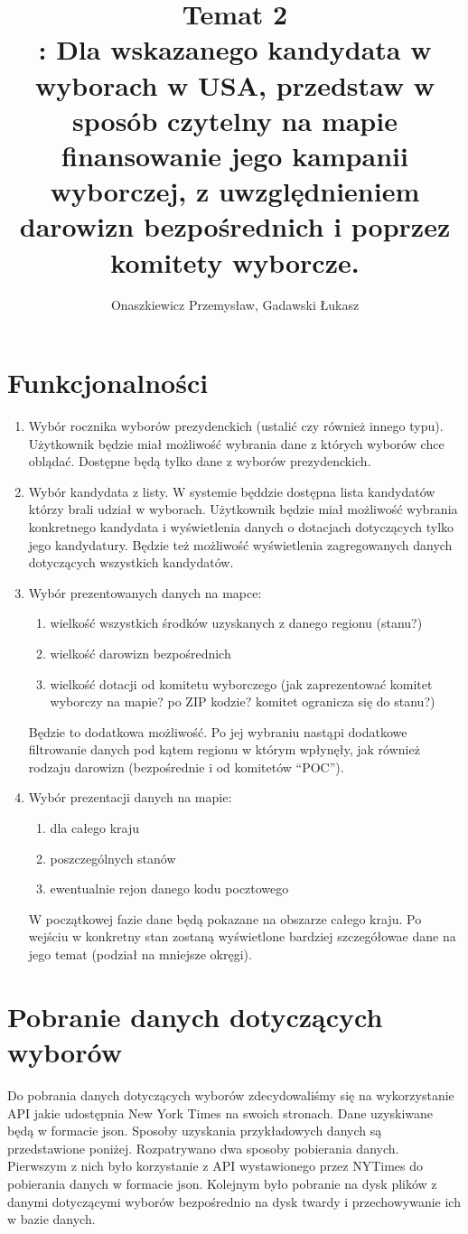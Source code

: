 \documentclass[10pt,a4paper]{article}
\author{Onaszkiewicz Przemysław, Gadawski Łukasz}
\title{Temat 2\\: Dla wskazanego kandydata w wyborach w USA, przedstaw w sposób czytelny na mapie finansowanie jego kampanii wyborczej, z uwzględnieniem darowizn bezpośrednich i poprzez komitety wyborcze. 
}
\begin{document}
\maketitle

\section{Funkcjonalności}
\begin{enumerate}
\item Wybór rocznika wyborów prezydenckich (ustalić czy również innego typu). Użytkownik będzie miał możliwość wybrania dane z których wyborów chce oblądać. Dostępne będą tylko dane z wyborów prezydenckich.
\item Wybór kandydata z listy. W systemie będdzie dostępna lista kandydatów którzy brali udział w wyborach. Użytkownik będzie miał możliwość wybrania konkretnego kandydata i wyświetlenia danych o dotacjach dotyczących tylko jego kandydatury. Będzie też możliwość wyświetlenia zagregowanych danych dotyczących wszystkich kandydatów. 
\item Wybór prezentowanych danych na mapce:
\begin{enumerate}
\item wielkość wszystkich środków uzyskanych z danego regionu (stanu?)
\item wielkość darowizn bezpośrednich
\item wielkość dotacji od komitetu wyborczego (jak zaprezentować komitet wyborczy na mapie? po ZIP kodzie? komitet ogranicza się do stanu?)
\end{enumerate}
 Będzie to dodatkowa możliwość. Po jej wybraniu nastąpi dodatkowe filtrowanie danych pod kątem regionu w którym wpłynęły, jak również rodzaju darowizn (bezpośrednie i od komitetów “POC”).
\item Wybór prezentacji danych na mapie:
\begin{enumerate}
\item dla całego kraju
\item poszczególnych stanów
\item ewentualnie rejon danego kodu pocztowego
\end{enumerate}

W początkowej fazie dane będą pokazane na obszarze całego kraju. Po wejściu w 
konkretny  stan zostaną wyświetlone bardziej szczegółowae dane na jego temat 
(podział na mniejsze okręgi). 

\end{enumerate}
\section{Pobranie danych dotyczących wyborów}
Do pobrania danych dotyczących wyborów zdecydowaliśmy się na wykorzystanie API jakie udostępnia New York Times na swoich stronach. Dane uzyskiwane będą w formacie json.   
Sposoby uzyskania przykładowych danych są przedstawione poniżej. 
Rozpatrywano dwa sposoby pobierania danych. Pierwszym z nich było korzystanie z API wystawionego przez NYTimes  do pobierania danych w formacie json. Kolejnym było pobranie na dysk plików z danymi dotyczącymi wyborów bezpośrednio na dysk twardy i przechowywanie ich w bazie danych.
\end{document}
